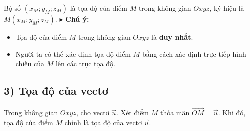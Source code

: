 \documentclass[12pt,a4paper]{extarticle}
\begin{document}
\vspace{1em}
\noindent Bộ số $(x_M; y_M; z_M)$ là tọa độ của điểm $M$ trong không gian $Oxyz$, ký hiệu là $M(x_M; y_M; z_M)$.
\vspace{1.5em}
\noindent $\blacktriangleright$ \textbf{Chú ý:}
\begin{itemize}[leftmargin=*, label=$\circ$]
    \item Tọa độ của điểm $M$ trong không gian $Oxyz$ là \textbf{duy nhất}.
    \item Người ta có thể xác định tọa độ điểm $M$ bằng cách xác định trực tiếp hình chiếu của $M$ lên các trục tọa độ.
\end{itemize}
\subsection*{3) Tọa độ của vectơ}

\noindent Trong không gian $Oxyz$, cho vectơ $\vec{u}$. Xét điểm $M$ thỏa mãn $\vec{OM} = \vec{u}$. Khi đó, tọa độ của điểm $M$ chính là tọa độ của vectơ $\vec{u}$.
\end{document}
